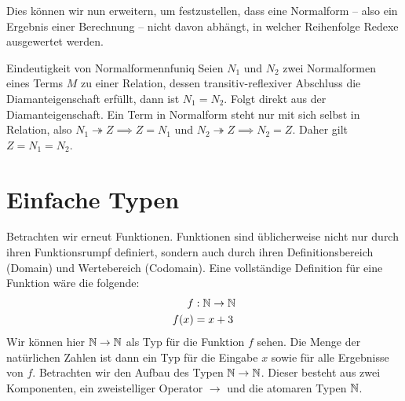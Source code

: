Dies können wir nun erweitern, um festzustellen, dass eine Normalform -- also ein Ergebnis einer Berechnung -- nicht davon abhängt, in welcher Reihenfolge Redexe ausgewertet werden.

\begin{lemma}{Eindeutigkeit von Normalformen}{nfuniq}
    Seien $N_1$ und $N_2$ zwei Normalformen eines Terms $M$ zu einer Relation, dessen transitiv-reflexiver Abschluss die Diamanteigenschaft erfüllt, dann ist $N_1 = N_2$.
    \Proof
    Folgt direkt aus der Diamanteigenschaft. Ein Term in Normalform steht nur mit sich selbst in Relation, also $N_1 \twoheadrightarrow Z \implies Z = N_1$ und $N_2 \twoheadrightarrow Z \implies N_2 = Z$. Daher gilt $Z = N_1 = N_2$.
\end{lemma}
\section{Einfache Typen}
\label{sec:simpltypes}
Betrachten wir erneut Funktionen. Funktionen sind üblicherweise nicht nur durch ihren Funktionsrumpf definiert, sondern auch durch ihren Definitionsbereich (Domain) und Wertebereich (Codomain). Eine vollständige Definition für eine Funktion wäre die folgende:
\begin{align*}
f&:\mathbb{N}\to\mathbb{N}\\
f(x) &= x + 3
\end{align*}
Wir können hier $\mathbb{N}\to\mathbb{N}$ als Typ für die Funktion $f$ sehen. Die Menge der natürlichen Zahlen ist dann ein Typ für die Eingabe $x$ sowie für alle Ergebnisse von $f$. Betrachten wir den Aufbau des Typen $\mathbb{N}\to\mathbb{N}$. Dieser besteht aus zwei Komponenten, ein zweistelliger Operator $\to$ und die atomaren Typen $\mathbb{N}$. 

